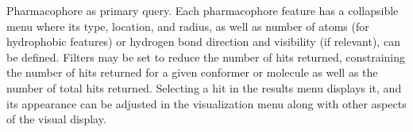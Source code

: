 \label{fig:pharmfig} Pharmacophore as primary query. Each pharmacophore feature has a collapsible menu where its type, location, and radius, as well as number of atoms (for hydrophobic features) or hydrogen bond direction and visibility (if relevant), can be defined. Filters may be set to reduce the number of hits returned, constraining the number of hits returned for a given conformer or molecule as well as the number of total hits returned. Selecting a hit in the results menu displays it, and its appearance can be adjusted in the visualization menu along with other aspects of the visual display. 